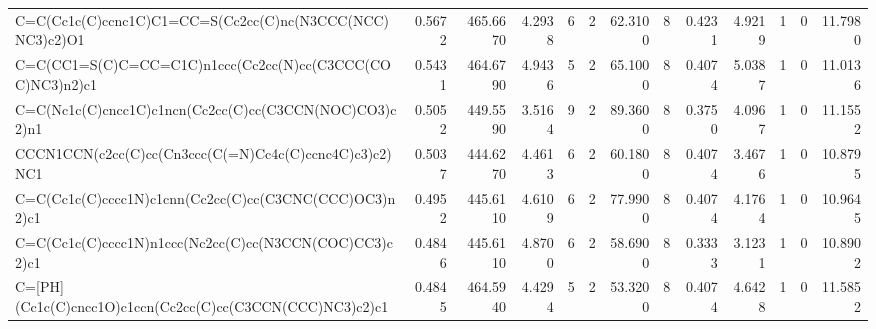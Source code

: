 \begin{tabular}{lrrrrrrrrrrrr}
C=C(Cc1c(C)ccnc1C)C1=CC=S(Cc2cc(C)nc(N3CCC(NCC)NC3)c2)O1 & 0.5672 & 465.6670 & 4.2938 & 6 & 2 & 62.3100 & 8 & 0.4231 & 4.9219 & 1 & 0 & 11.7980 \\
C=C(CC1=S(C)C=CC=C1C)n1ccc(Cc2cc(N)cc(C3CCC(COC)NC3)n2)c1 & 0.5431 & 464.6790 & 4.9436 & 5 & 2 & 65.1000 & 8 & 0.4074 & 5.0387 & 1 & 0 & 11.0136 \\
C=C(Nc1c(C)cncc1C)c1ncn(Cc2cc(C)cc(C3CCN(NOC)CO3)c2)n1 & 0.5052 & 449.5590 & 3.5164 & 9 & 2 & 89.3600 & 8 & 0.3750 & 4.0967 & 1 & 0 & 11.1552 \\
CCCN1CCN(c2cc(C)cc(Cn3ccc(C(=N)Cc4c(C)ccnc4C)c3)c2)NC1 & 0.5037 & 444.6270 & 4.4613 & 6 & 2 & 60.1800 & 8 & 0.4074 & 3.4676 & 1 & 0 & 10.8795 \\
C=C(Cc1c(C)cccc1N)c1cnn(Cc2cc(C)cc(C3CNC(CCC)OC3)n2)c1 & 0.4952 & 445.6110 & 4.6109 & 6 & 2 & 77.9900 & 8 & 0.4074 & 4.1764 & 1 & 0 & 10.9645 \\
C=C(Cc1c(C)cccc1N)n1ccc(Nc2cc(C)cc(N3CCN(COC)CC3)c2)c1 & 0.4846 & 445.6110 & 4.8700 & 6 & 2 & 58.6900 & 8 & 0.3333 & 3.1231 & 1 & 0 & 10.8902 \\
C=[PH](Cc1c(C)cncc1O)c1ccn(Cc2cc(C)cc(C3CCN(CCC)NC3)c2)c1 & 0.4845 & 464.5940 & 4.4294 & 5 & 2 & 53.3200 & 8 & 0.4074 & 4.6428 & 1 & 0 & 11.5852 \\
\bottomrule
\end{tabular}
